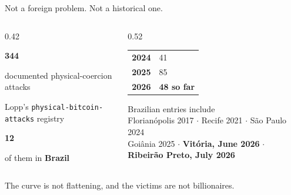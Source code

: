 \documentclass[aspectratio=169,12pt]{beamer}
\newcommand{\bad}[1]{{\color{attackcol}\bfseries #1}}
\begin{document}
\begin{frame}[t]{Not a foreign problem. Not a historical one.}
  \vspace{0.44em}
  \begin{columns}[T]
    \begin{column}{0.42\textwidth}
      {\color{accentdark}\Huge\bfseries 344\par}
      {\small documented physical-coercion attacks\par
       \color{graytext} Lopp's \texttt{physical-bitcoin-attacks} registry\par}
      \vspace{0.61em}
      {\color{accentdark}\Huge\bfseries 12\par}
      {\small of them in \textbf{Brazil}\par}
    \end{column}
    \begin{column}{0.52\textwidth}
      \vspace{0.22em}
      {\small
      \begin{tabular}{@{}ll@{}}
        \textbf{2024} & 41\\[2pt]
        \textbf{2025} & 85\\[2pt]
        \bad{2026} & \bad{48 so far}\\
      \end{tabular}\par}
      \vspace{0.61em}
      {\footnotesize\color{graytext}
       Brazilian entries include\\
       Florianópolis 2017 $\cdot$ Recife 2021 $\cdot$ São Paulo 2024\\
       Goiânia 2025 $\cdot$ \textbf{Vitória, June 2026} $\cdot$
       \textbf{Ribeirão Preto, July 2026}\par}
    \end{column}
  \end{columns}
  \vfill
  {\small The curve is not flattening, and the victims are not billionaires.}
  \vspace{0.22em}
\end{frame}
\end{document}
